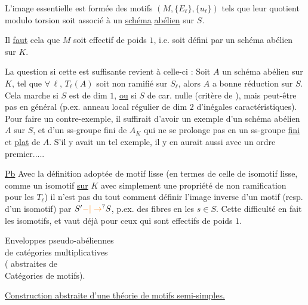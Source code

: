 L'image essentielle est  formée des motifs $(M,\{E_\ell\},\{u_\ell\})$ tels que  leur quotient modulo torsion soit associé à un \uline{schéma} \uline{abélien} sur $S$.

Il \uline{faut} \uline{} cela que $M$ soit effectif de poids $1$, i.e. soit défini par un schéma abélien  sur $K$. 

La question si cette  est suffisante revient à celle-ci : Soit $A$ un schéma abélien sur $K$,  tel que $\forall\,\ell$,  $T_\ell(A)$ soit non ramifié sur $S_\ell$, alors $A$ a bonne réduction sur $S$. Cela marche si $S$ est de dim $1$, \uline{ou} si $S$ de car. nulle (critère de ), mais peut-être pas en général (p.ex. anneau local régulier de dim $2$ d'inégales caractéristiques). Pour faire un contre-exemple, il suffirait d'avoir un exemple d'un schéma abélien $A$ sur $S$, et d'un ss-groupe fini de $A_K$ qui ne se prolonge pas en un ss-groupe \uline{fini} et \uline{plat} de $A$. S'il y avait un tel exemple, il y en aurait aussi avec un ordre premier.....

\uline{Pb} Avec la définition adoptée de motif lisse (en termes de celle de isomotif lisse, comme un isomotif \uline{sur} $K$ avec simplement une propriété  de non ramification pour les $T_\ell$) il n'est pas du tout  comment définir l'image inverse d'un motif (resp. d'un isomotif) par $S'\unsure{\mathord{-}|\to}S$, p.ex. des fibres en les $s\in S$. Cette difficulté  en fait les isomotifs, et vaut déjà pour ceux qui sont effectifs de poids $1$.
\begin{flushright}\begin{minipage}{0.46\linewidth}\raggedright
Enveloppes pseudo-abéliennes\\
de catégories multiplicatives\\
( abstraites de\\
Catégories de motifs).
\end{minipage}\end{flushright}
\uline{Construction abstraite d'une théorie de motifs semi-simples.}

